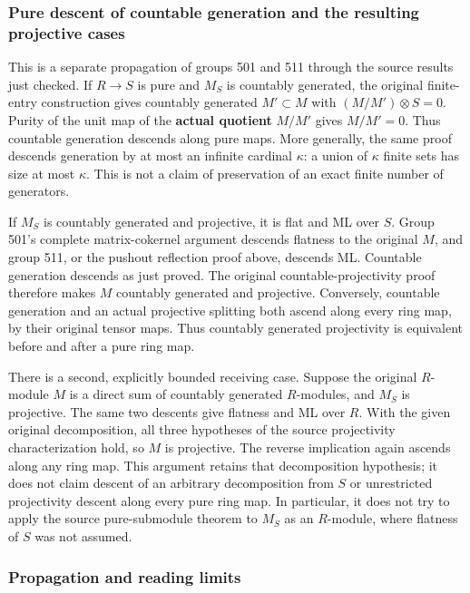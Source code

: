 \subsubsection{Pure descent of countable generation and the resulting projective cases}\label{algebra-proof-013-pure-descent-of-countable-generation-and-the-resulting-projective-cases}

This is a separate propagation of groups 501 and 511 through the source results just checked. If \(R\to S\) is pure and \(M_S\) is countably generated, the original finite-entry construction gives countably generated \(M'\subset M\) with \((M/M')\otimes S=0\). Purity of the unit map of the \textbf{actual quotient} \(M/M'\) gives \(M/M'=0\). Thus countable generation descends along pure maps. More generally, the same proof descends generation by at most an infinite cardinal \(\kappa\): a union of \(\kappa\) finite sets has size at most \(\kappa\). This is not a claim of preservation of an exact finite number of generators.

If \(M_S\) is countably generated and projective, it is flat and ML over \(S\). Group 501's complete matrix-cokernel argument descends flatness to the original \(M\), and group 511, or the pushout reflection proof above, descends ML. Countable generation descends as just proved. The original countable-projectivity proof therefore makes \(M\) countably generated and projective. Conversely, countable generation and an actual projective splitting both ascend along every ring map, by their original tensor maps. Thus countably generated projectivity is equivalent before and after a pure ring map.

There is a second, explicitly bounded receiving case. Suppose the original \(R\)-module \(M\) is a direct sum of countably generated \(R\)-modules, and \(M_S\) is projective. The same two descents give flatness and ML over \(R\). With the given original decomposition, all three hypotheses of the source projectivity characterization hold, so \(M\) is projective. The reverse implication again ascends along any ring map. This argument retains that decomposition hypothesis; it does not claim descent of an arbitrary decomposition from \(S\) or unrestricted projectivity descent along every pure ring map. In particular, it does not try to apply the source pure-submodule theorem to \(M_S\) as an \(R\)-module, where flatness of \(S\) was not assumed.

\subsubsection{Propagation and reading limits}\label{algebra-proof-013-propagation-and-reading-limits}

